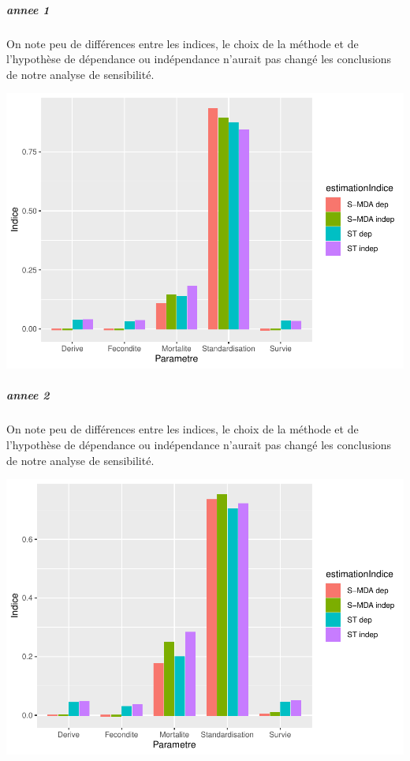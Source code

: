 \documentclass[
]{article}
\begin{document}
\hypertarget{annee-1-1}{%
\subparagraph{annee 1}\label{annee-1-1}}

On note peu de différences entre les indices, le choix de la méthode et
de l'hypothèse de dépendance ou indépendance n'aurait pas changé les
conclusions de notre analyse de sensibilité.

\includegraphics{rapport_files/figure-latex/prteygs-1.pdf}

\hypertarget{annee-2-1}{%
\subparagraph{annee 2}\label{annee-2-1}}

On note peu de différences entre les indices, le choix de la méthode et
de l'hypothèse de dépendance ou indépendance n'aurait pas changé les
conclusions de notre analyse de sensibilité.

\includegraphics{rapport_files/figure-latex/pertygsd-1.pdf}
\end{document}
